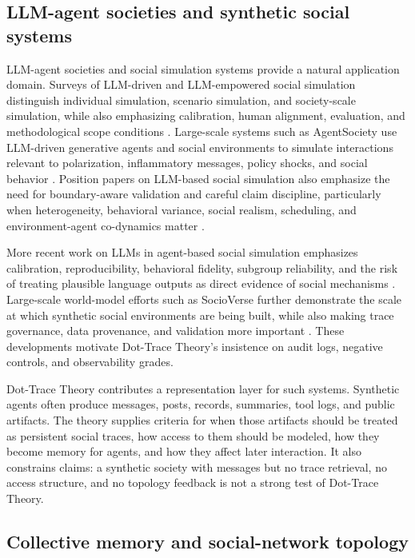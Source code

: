 \documentclass[11pt]{article}
\theoremstyle{remark}
\begin{document}
\subsection{LLM-agent societies and synthetic social systems}\label{llm-agent-societies-synthetic-systems}

LLM-agent societies and social simulation systems provide a natural application domain. Surveys of LLM-driven and LLM-empowered social simulation distinguish individual simulation, scenario simulation, and society-scale simulation, while also emphasizing calibration, human alignment, evaluation, and methodological scope conditions \citep{gao2024llmabm,mou2024socialsimulation}. Large-scale systems such as AgentSociety use LLM-driven generative agents and social environments to simulate interactions relevant to polarization, inflammatory messages, policy shocks, and social behavior \citep{piao2025agentsociety}. Position papers on LLM-based social simulation also emphasize the need for boundary-aware validation and careful claim discipline, particularly when heterogeneity, behavioral variance, social realism, scheduling, and environment-agent co-dynamics matter \citep{wu2025boundary,li2026notpanacea}.

More recent work on LLMs in agent-based social simulation emphasizes calibration, reproducibility, behavioral fidelity, subgroup reliability, and the risk of treating plausible language outputs as direct evidence of social mechanisms \citep{taillandier2025integrating,madden2025synthetic}. Large-scale world-model efforts such as SocioVerse further demonstrate the scale at which synthetic social environments are being built, while also making trace governance, data provenance, and validation more important \citep{zhang2025socioverse}. These developments motivate Dot-Trace Theory's insistence on audit logs, negative controls, and observability grades.


Dot-Trace Theory contributes a representation layer for such systems. Synthetic agents often produce messages, posts, records, summaries, tool logs, and public artifacts. The theory supplies criteria for when those artifacts should be treated as persistent social traces, how access to them should be modeled, how they become memory for agents, and how they affect later interaction. It also constrains claims: a synthetic society with messages but no trace retrieval, no access structure, and no topology feedback is not a strong test of Dot-Trace Theory.

\subsection{Collective memory and social-network topology}\label{collective-memory-social-network-topology}
\end{document}
